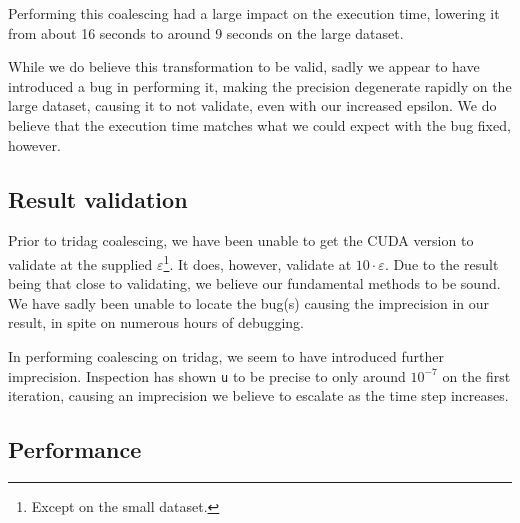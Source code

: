 \documentclass[a4paper]{article}
\begin{document}
Performing this coalescing had a large impact on the execution time, lowering
it from about 16 seconds to around 9 seconds on the large dataset.

While we do believe this transformation to be valid, sadly we appear to have
introduced a bug in performing it, making the precision degenerate rapidly
on the large dataset, causing it to not validate, even with our increased
epsilon. We do believe that the execution time matches what we could expect
with the bug fixed, however.

\subsection{Result validation}

Prior to tridag coalescing, we have been unable to get the CUDA version to
validate at the supplied $\varepsilon$\footnote{Except on the small dataset.}. It
does, however, validate at $10 \cdot \varepsilon$. Due to the result being that
close to validating, we believe our fundamental methods to be sound. We have
sadly been unable to locate the bug(s) causing the imprecision in our result,
in spite on numerous hours of debugging.

In performing coalescing on tridag, we seem to have introduced further
imprecision. Inspection has shown \texttt{u} to be precise to only around
$10^{-7}$ on the first iteration, causing an imprecision we believe to
escalate as the time step increases.

\subsection{Performance}



\end{document}
